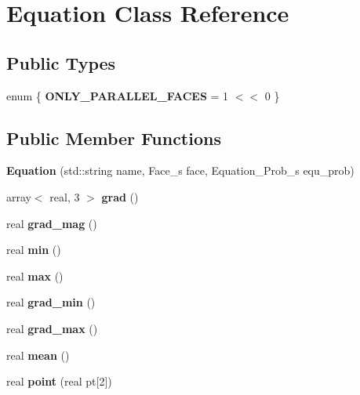 \hypertarget{classEquation}{
\section{Equation Class Reference}
\label{classEquation}
}
\subsection*{Public Types}
\begin{DoxyCompactItemize}
\item 
enum \{ {\bfseries ONLY\_\-PARALLEL\_\-FACES} =  1 $<$$<$ 0
 \}
\end{DoxyCompactItemize}
\subsection*{Public Member Functions}
\begin{DoxyCompactItemize}
\item 
\hypertarget{classEquation_aa828f4c9f7a849e9ae29f2c9491863d6}{
{\bfseries Equation} (std::string name, Face\_\-s face, Equation\_\-Prob\_\-s equ\_\-prob)}
\label{classEquation_aa828f4c9f7a849e9ae29f2c9491863d6}

\item 
\hypertarget{classEquation_acda03fc82a1a28ab32f127754bf37aea}{
array$<$ real, 3 $>$ {\bfseries grad} ()}
\label{classEquation_acda03fc82a1a28ab32f127754bf37aea}

\item 
\hypertarget{classEquation_ab67fb5e35d95e74756aed668b072c03f}{
real {\bfseries grad\_\-mag} ()}
\label{classEquation_ab67fb5e35d95e74756aed668b072c03f}

\item 
\hypertarget{classEquation_a629f1ff3c54e7fcfe597c20ab49c773b}{
real {\bfseries min} ()}
\label{classEquation_a629f1ff3c54e7fcfe597c20ab49c773b}

\item 
\hypertarget{classEquation_a1e95e7d54591e5dc5c68ccca547101c5}{
real {\bfseries max} ()}
\label{classEquation_a1e95e7d54591e5dc5c68ccca547101c5}

\item 
\hypertarget{classEquation_a3a22bc1a6dd067b6feaf6fc6281a5c1f}{
real {\bfseries grad\_\-min} ()}
\label{classEquation_a3a22bc1a6dd067b6feaf6fc6281a5c1f}

\item 
\hypertarget{classEquation_ae2b284533eda56200c9122846623eb45}{
real {\bfseries grad\_\-max} ()}
\label{classEquation_ae2b284533eda56200c9122846623eb45}

\item 
\hypertarget{classEquation_ae0198edcc6a9a44ed7d88d8279f91cee}{
real {\bfseries mean} ()}
\label{classEquation_ae0198edcc6a9a44ed7d88d8279f91cee}

\item 
\hypertarget{classEquation_a780d64d5a94161a5cf71d0d08a6ffe5b}{
real {\bfseries point} (real pt\mbox{[}2\mbox{]})}
\label{classEquation_a780d64d5a94161a5cf71d0d08a6ffe5b}

\end{DoxyCompactItemize}
